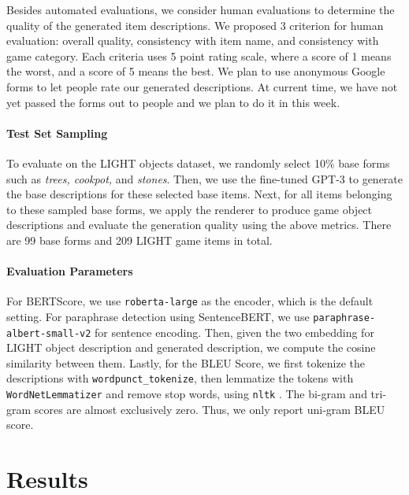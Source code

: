 \documentclass[11pt]{article}
\begin{document}
Besides automated evaluations, we consider human evaluations to determine the quality of the generated item descriptions. We proposed 3 criterion for human evaluation: overall quality, consistency with item name, and consistency with game category. Each criteria uses 5 point rating scale, where a score of 1 means the worst, and a score of 5 means the best. We plan to use anonymous Google forms to let people rate our generated descriptions. At current time, we have not yet passed the forms out to people and we plan to do it in this week.

\paragraph{Test Set Sampling}
To evaluate on the LIGHT objects dataset, we randomly select 10\% base forms such as \textit{trees, cookpot,} and \textit{stones}. Then, we use the fine-tuned GPT-3 to generate the base descriptions for these selected base items. Next, for all items belonging to these sampled base forms, we apply the renderer to produce game object descriptions and evaluate the generation quality using the above metrics. There are 99 base forms and 209 LIGHT game items in total.

\paragraph{Evaluation Parameters}
For BERTScore, we use \lstinline{roberta-large} as the encoder, which is the default setting. For paraphrase detection using SentenceBERT, we use \lstinline{paraphrase-albert-small-v2} for sentence encoding. Then, given the two embedding for LIGHT object description and generated description, we compute the cosine similarity between them. Lastly, for the BLEU Score, we first tokenize the descriptions with \lstinline{wordpunct_tokenize}, then lemmatize the tokens with \lstinline{WordNetLemmatizer} and remove stop words, using \lstinline{nltk} \cite{bird2009natural}. The bi-gram and tri-gram scores are almost exclusively zero. Thus, we only report uni-gram BLEU score.

\section{Results}
\end{document}
